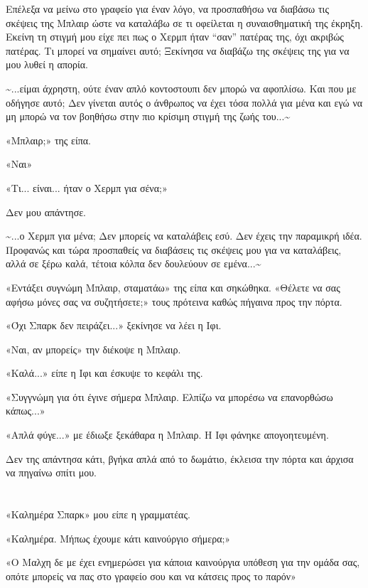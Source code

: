 \documentclass[12pt,twoside, openany]{book}
\begin{document}
Επέλεξα να μείνω στο γραφείο για έναν λόγο, να προσπαθήσω να διαβάσω τις σκέψεις της Μπλαιρ ώστε να καταλάβω σε τι οφείλεται η συναισθηματική της έκρηξη. Εκείνη τη στιγμή μου είχε πει πως ο Χερμπ ήταν “σαν” πατέρας της, όχι ακριβώς πατέρας. Τι μπορεί να σημαίνει αυτό; Ξεκίνησα να διαβάζω της σκέψεις της για να μου λυθεί η απορία.

\textasciitilde ...είμαι άχρηστη, ούτε έναν απλό κοντοστουπι δεν μπορώ να αφοπλίσω. Και που με οδήγησε αυτό; Δεν γίνεται αυτός ο άνθρωπος να έχει τόσα πολλά για μένα και εγώ να μη μπορώ να τον βοηθήσω στην πιο κρίσιμη στιγμή της ζωής του...\textasciitilde 

«Μπλαιρ;» της είπα.

«Ναι»

«Τι... είναι... ήταν ο Χερμπ για σένα;»

Δεν μου απάντησε.

\textasciitilde ...ο Χερμπ για μένα; Δεν μπορείς να καταλάβεις εσύ. Δεν έχεις την παραμικρή ιδέα. Προφανώς και τώρα προσπαθείς να διαβάσεις τις σκέψεις μου για να καταλάβεις, αλλά σε ξέρω καλά, τέτοια κόλπα δεν δουλεύουν σε εμένα...\textasciitilde 

«Εντάξει συγνώμη Μπλαιρ, σταματάω» της είπα και σηκώθηκα. «Θέλετε να σας αφήσω μόνες σας να συζητήσετε;» τους πρότεινα καθώς πήγαινα προς την πόρτα.

«Όχι Σπαρκ δεν πειράζει...» ξεκίνησε να λέει η Ιφι.

«Ναι, αν μπορείς» την διέκοψε η Μπλαιρ.

«Καλά...» είπε η Ιφι και έσκυψε το κεφάλι της.

«Συγγνώμη για ότι έγινε σήμερα Μπλαιρ. Ελπίζω να μπορέσω να επανορθώσω κάπως...»

«Απλά φύγε...» με έδιωξε ξεκάθαρα η Μπλαιρ. Η Ιφι φάνηκε απογοητευμένη.

Δεν της απάντησα κάτι, βγήκα απλά από το δωμάτιο, έκλεισα την πόρτα και άρχισα να πηγαίνω σπίτι μου.

\chapter{}

«Καλημέρα Σπαρκ» μου είπε η γραμματέας.

«Καλημέρα. Μήπως έχουμε κάτι καινούργιο σήμερα;»

«Ο Μαλχη δε με έχει ενημερώσει για κάποια καινούργια υπόθεση για την ομάδα σας, οπότε μπορείς να πας στο γραφείο σου και να κάτσεις προς το παρόν»
\end{document}
